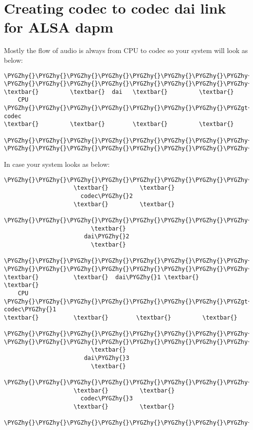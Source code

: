 \documentclass[a4paper,8pt,english]{sphinxmanual}
\def\PYGZgt{\char`\>}
\def\PYGZhy{\char`\-}
\begin{document}
\section{Creating codec to codec dai link for ALSA dapm}
\label{sound/soc/codec-to-codec:creating-codec-to-codec-dai-link-for-alsa-dapm}\label{sound/soc/codec-to-codec::doc}
Mostly the flow of audio is always from CPU to codec so your system
will look as below:

\begin{Verbatim}[commandchars=\\\{\}]
 \PYGZhy{}\PYGZhy{}\PYGZhy{}\PYGZhy{}\PYGZhy{}\PYGZhy{}\PYGZhy{}\PYGZhy{}\PYGZhy{}          \PYGZhy{}\PYGZhy{}\PYGZhy{}\PYGZhy{}\PYGZhy{}\PYGZhy{}\PYGZhy{}\PYGZhy{}\PYGZhy{}
\textbar{}         \textbar{}  dai   \textbar{}         \textbar{}
    CPU    \PYGZhy{}\PYGZhy{}\PYGZhy{}\PYGZhy{}\PYGZhy{}\PYGZhy{}\PYGZhy{}\PYGZgt{}    codec
\textbar{}         \textbar{}        \textbar{}         \textbar{}
 \PYGZhy{}\PYGZhy{}\PYGZhy{}\PYGZhy{}\PYGZhy{}\PYGZhy{}\PYGZhy{}\PYGZhy{}\PYGZhy{}          \PYGZhy{}\PYGZhy{}\PYGZhy{}\PYGZhy{}\PYGZhy{}\PYGZhy{}\PYGZhy{}\PYGZhy{}\PYGZhy{}
\end{Verbatim}

In case your system looks as below:

\begin{Verbatim}[commandchars=\\\{\}]
                     \PYGZhy{}\PYGZhy{}\PYGZhy{}\PYGZhy{}\PYGZhy{}\PYGZhy{}\PYGZhy{}\PYGZhy{}\PYGZhy{}
                    \textbar{}         \textbar{}
                      codec\PYGZhy{}2
                    \textbar{}         \textbar{}
                    \PYGZhy{}\PYGZhy{}\PYGZhy{}\PYGZhy{}\PYGZhy{}\PYGZhy{}\PYGZhy{}\PYGZhy{}\PYGZhy{}
                         \textbar{}
                       dai\PYGZhy{}2
                         \textbar{}
 \PYGZhy{}\PYGZhy{}\PYGZhy{}\PYGZhy{}\PYGZhy{}\PYGZhy{}\PYGZhy{}\PYGZhy{}\PYGZhy{}\PYGZhy{}          \PYGZhy{}\PYGZhy{}\PYGZhy{}\PYGZhy{}\PYGZhy{}\PYGZhy{}\PYGZhy{}\PYGZhy{}\PYGZhy{}
\textbar{}          \textbar{}  dai\PYGZhy{}1 \textbar{}         \textbar{}
    CPU     \PYGZhy{}\PYGZhy{}\PYGZhy{}\PYGZhy{}\PYGZhy{}\PYGZhy{}\PYGZhy{}\PYGZgt{}  codec\PYGZhy{}1
\textbar{}          \textbar{}        \textbar{}         \textbar{}
 \PYGZhy{}\PYGZhy{}\PYGZhy{}\PYGZhy{}\PYGZhy{}\PYGZhy{}\PYGZhy{}\PYGZhy{}\PYGZhy{}\PYGZhy{}          \PYGZhy{}\PYGZhy{}\PYGZhy{}\PYGZhy{}\PYGZhy{}\PYGZhy{}\PYGZhy{}\PYGZhy{}\PYGZhy{}
                         \textbar{}
                       dai\PYGZhy{}3
                         \textbar{}
                     \PYGZhy{}\PYGZhy{}\PYGZhy{}\PYGZhy{}\PYGZhy{}\PYGZhy{}\PYGZhy{}\PYGZhy{}\PYGZhy{}
                    \textbar{}         \textbar{}
                      codec\PYGZhy{}3
                    \textbar{}         \textbar{}
                     \PYGZhy{}\PYGZhy{}\PYGZhy{}\PYGZhy{}\PYGZhy{}\PYGZhy{}\PYGZhy{}\PYGZhy{}\PYGZhy{}
\end{Verbatim}
\end{document}

